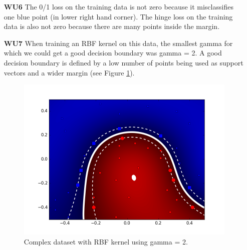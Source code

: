 \documentclass{article}
\begin{document}
\begin{enumerate}
	\item[\textbf{WU6}]
The 0/1 loss on the training data is not zero because it misclassifies one blue point (in lower right hand corner). The hinge loss on the training data is also not zero because there are many points inside the margin.

	\item[\textbf{WU7}]
When training an RBF kernel on this data, the smallest gamma for which we could get a good decision boundary was gamma = 2. A good decision boundary is defined by a low number of points being used as support vectors and a wider margin (see Figure \ref{fig:WU7}). 

\begin{figure}[htp]
\centering
\includegraphics[width=.5\textwidth]{wu7.png}
\caption{Complex dataset with RBF kernel using gamma = 2.}
\label{fig:WU7}
\end{figure}

\pagebreak

\end{enumerate}
\end{document}
